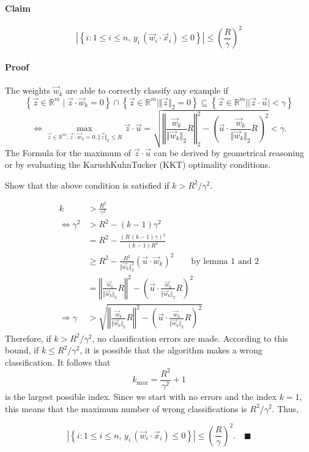 \paragraph*{Claim}

\[
\left|\left\{ i:1\le i\le n,\, y_{i}\,(\vec{w}_{i}\cdot\vec{x}_{i})\leq0\right\} \right|\leq\left(\frac{R}{\gamma}\right)^{2}
\]



\paragraph*{Proof}

The weights $\vec{w}_{k}$ are able to correctly classify any example
if
\[
\left\{ \vec{z}\in\mathbb{R}^{m}\mid\vec{z}\cdot\vec{w}_{k}=0\right\} \cap\left\{ \vec{z}\in\mathbb{R}^{m}\mid\Vert\vec{z}\Vert_{2}=0\right\} \subseteq\left\{ \vec{z}\in\mathbb{R}^{m}\mid\vert\vec{z}\cdot\vec{u}\vert<\gamma\right\}
\]
\[
\Leftrightarrow\max_{\vec{z}\in\mathbb{R}^{m},\vec{z}\cdot\vec{w}_{k}=0,\Vert\vec{z}\Vert_{2}\leq R}\vec{z}\cdot\vec{u}=\sqrt{\left\Vert \frac{\vec{w}_{k}}{\Vert\vec{w}_{k}\Vert_{2}}R\right\Vert _{2}^{2}-\left(\vec{u}\cdot\frac{\vec{w}_{k}}{\Vert\vec{w}_{k}\Vert_{2}}R\right)^{2}}<\gamma.
\]
The Formula for the maximum of $\vec{z}\cdot\vec{u}$ can be derived
by geometrical reasoning or by evaluating the Karush\textendash{}Kuhn\textendash{}Tucker
(KKT) optimality conditions.

Show that the above condition is satisfied if $k>R^{2}/\gamma^{2}$.

\begin{align*}
k & >\frac{R^{2}}{\gamma^{2}}\\
\Leftrightarrow\gamma^{2} & >R^{2}-(k-1)\gamma^{2}\\
 & =R^{2}-\frac{\left(R\,\left(k-1\right)\gamma\right){}^{2}}{\left(k-1\right)R^{2}}\\
 & \geq R^{2}-\frac{R^{2}}{\Vert\vec{w}_{k}\Vert_{2}^{2}}\left(\vec{u}\cdot\vec{w}_{k}\right)^{2}\qquad\text{by lemma 1 and 2}\\
 & =\left\Vert \frac{\vec{w}_{k}}{\Vert\vec{w}_{k}\Vert_{2}}R\right\Vert ^{2}-\left(\vec{u}\cdot\frac{\vec{w}_{k}}{\Vert\vec{w}_{k}\Vert_{2}}R\right)^{2}\\
\Rightarrow\gamma & >\sqrt{\left\Vert \frac{\vec{w}_{k}}{\Vert\vec{w}_{k}\Vert_{2}}R\right\Vert ^{2}-\left(\vec{u}\cdot\frac{\vec{w}_{k}}{\Vert\vec{w}_{k}\Vert_{2}}R\right)^{2}}
\end{align*}
Therefore, if $k>R^{2}/\gamma^{2}$, no classification errors are
made. According to this bound, if $k\leq R^{2}/\gamma^{2}$, it is
possible that the algorithm makes a wrong classification. It follows
that 
\[
k_{\max}=\frac{R^{2}}{\gamma^{2}}+1
\]
 is the largest possible index. Since we start with no errors and
the index $k=1$, this means that the maximum number of wrong classifications
is $R^{2}/\gamma^{2}.$ Thus,

\[
\left|\left\{ i:1\le i\le n,\, y_{i}\,(\vec{w}_{i}\cdot\vec{x}_{i})\leq0\right\} \right|\leq\left(\frac{R}{\gamma}\right)^{2}\!\!\!.\quad\blacksquare
\]